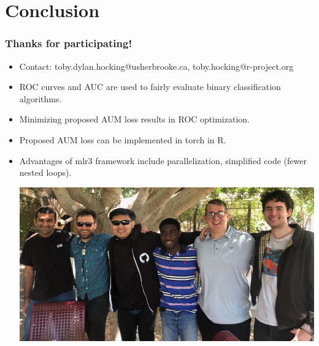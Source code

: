 \documentclass{beamer}
\begin{document}
\section{Conclusion}
 
\begin{frame}
  \frametitle{Thanks for participating!}
  \begin{itemize}
  \item Contact: toby.dylan.hocking@usherbrooke.ca, toby.hocking@r-project.org
  \item ROC curves and AUC are used to fairly evaluate binary classification algorithms.
  \item Minimizing proposed AUM loss results in ROC optimization.
  \item Proposed AUM loss can be implemented in torch in R.
  \item Advantages of mlr3 framework include parallelization, simplified code (fewer nested loops).
    
\includegraphics[width=\textwidth]{2023-04-14-ASU-ML-Day}

  \end{itemize}
\end{frame}
 
\end{document}
